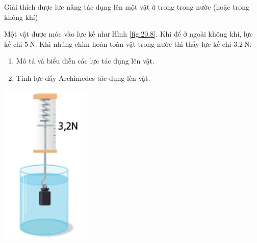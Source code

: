 \begin{dang}{Giải thích được lực nâng tác dụng lên một vật ở trong trong nước (hoặc trong không khí)}
	{\begin{minipage}[l]{0.7\textwidth}
			Một vật được móc vào lực kế như Hình \ref{fig:20.8}. Khi để ở ngoài không khí, lực kế chỉ $\SI{5}{\newton}$. Khi nhúng chìm hoàn toàn vật trong nước thì thấy lực kế chỉ $\SI{3.2}{\newton}$.
			\begin{enumerate}[label=\alph*)]
				\item Mô tả và biểu diễn các lực tác dụng lên vật.
				\item Tính lực đẩy Archimedes tác dụng lên vật.
			\end{enumerate}
		\end{minipage}
		\begin{minipage}{0.3\textwidth}
			\begin{center}
				\includegraphics[width=0.3\linewidth]{../figs/VN10-2023-PH-TP020-8}
				\label{fig:20.8}
			\end{center}
		\end{minipage}
}
{}
\end{dang}

